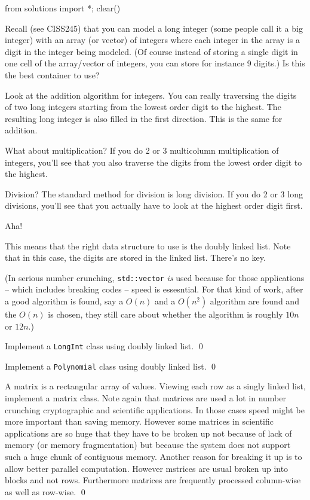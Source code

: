 \begin{python0}
from solutions import *; clear()
\end{python0}

Recall (see CISS245) that you can model a long integer (some people
call it a big integer) with an array (or vector) of integers
where each integer in the array is a digit in the integer being modeled.
(Of course instead of storing a single digit in one cell of the array/vector
of integers, you can store for instance 9 digits.)
Is this the best container to use?

Look at the addition algorithm for integers.
You can really traversing the digits of two long integers
starting from the lowest order digit to the highest.
The resulting long integer is also filled in the first direction.
This is the same for addition.

What about multiplication?
If you do 2 or 3 multicolumn multiplication of integers,
you'll see that you also traverse the digits from the
lowest order digit to the highest.

Division?
The standard method for division is long division.
If you do 2 or 3 long divisions, you'll see that
you actually have to look at the highest order digit first.

Aha!

This means that the right data structure to use is
the doubly linked list.
Note that in this case, the digits are stored in the
linked list.
There's no key.

(In serious number crunching, \texttt{std::vector} \textit{is} used
because for those applications -- which includes breaking codes --
speed is essesntial.
For that kind of work, after a good algorithm is found,
say a $O(n)$ and a $O(n^2)$ algorithm are found and the
$O(n)$ is chosen, they still care about whether the
algorithm is roughly $10n$ or $12n$.)


\begin{ex}
Implement a \verb!LongInt! class using doubly linked list.
\qed
\end{ex}

\begin{ex}
Implement a \verb!Polynomial! class using doubly linked list.
\qed
\end{ex}

\begin{ex}
A matrix is a rectangular array of values.
Viewing each row as a singly linked list, implement
a matrix class.
Note again that matrices are used a lot in number crunching
cryptographic and scientific applications.
In those cases speed might be more important than saving
memory.
However some matrices in scientific applications
are so huge that they have to be broken up
not because of lack of memory (or memory fragmentation)
but because the system does not support such a huge chunk of
contiguous memory.
Another reason for breaking it up is to allow better
parallel computation.
However mstrices are usual broken up into blocks and not
rows.
Furthermore matrices are frequently processed column-wise
as well as row-wise.
\qed
\end{ex}
  
